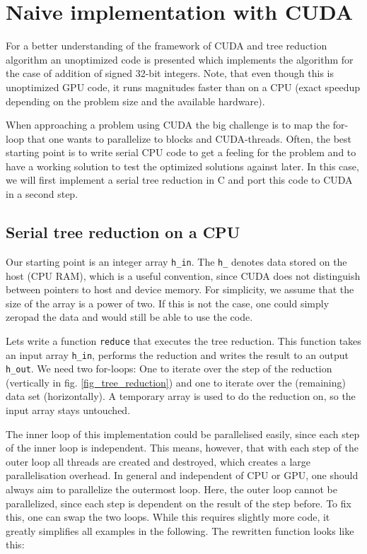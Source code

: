 \section{Naive implementation with CUDA}
For a better understanding of the framework of CUDA and tree reduction algorithm an unoptimized code is presented which implements the algorithm for the case of addition of signed 32-bit integers. 
Note, that even though this is unoptimized GPU code, it runs magnitudes faster than on a CPU (exact speedup depending on the problem size and the available hardware).

When approaching a problem using CUDA the big challenge is to map the for-loop that one wants to parallelize to blocks and CUDA-threads. 
Often, the best starting point is to write serial CPU code to get a feeling for the problem and to have a working solution to test the optimized solutions against later.
In this case, we will first implement a serial tree reduction in C and port this code to CUDA in a second step.

\subsection{Serial tree reduction on a CPU}
Our starting point is an integer array \texttt{h\_in}.
The \texttt{h\_} denotes data stored on the host (CPU RAM), which is a useful convention, since CUDA does not distinguish between pointers to host and device memory.
For simplicity, we assume that the size of the array is a power of two.
If this is not the case, one could simply zeropad the data and would still be able to use the code.

Lets write a function \texttt{reduce} that executes the tree reduction.
This function takes an input array \texttt{h\_in}, performs the reduction and writes the result to an output \texttt{h\_out}. 
We need two for-loops:
One to iterate over the step of the reduction (vertically in fig. \ref{fig_tree_reduction}) and one to iterate over the (remaining) data set (horizontally). 
A temporary array is used to do the reduction on, so the input array stays untouched.



The inner loop of this implementation could be parallelised easily, since each step of the inner loop is independent.
This means, however, that with each step of the outer loop all threads are created and destroyed, which creates a large parallelisation overhead.
In general and independent of CPU or GPU, one should always aim to parallelize the outermost loop.
Here, the outer loop cannot be parallelized, since each step is dependent on the result of the step before.
To fix this, one can swap the two loops.
While this requires slightly more code, it greatly simplifies all examples in the following.
The rewritten function looks like this:

